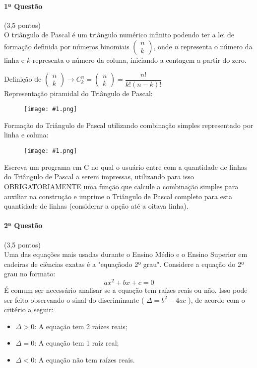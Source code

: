 \documentclass[12pt,a4paper]{article}
\newcommand{\imgh}[2]{\begin{figure}[h]
\centering
\texttt{[image: \#1.png]}
\end{figure}}
\begin{document}
\paragraph{1ª Questão} (3,5 pontos)\\
O triângulo de Pascal é um triângulo numérico infinito podendo ter a lei de formação definida por números binomiais $\left( \begin{matrix}n \\ k \end{matrix}\right)$, onde $n$ representa o número da linha e $k$ representa o número da coluna, iniciando a contagem a partir do zero.

Definição de $\left( \begin{matrix}n \\ k \end{matrix}\right) \longrightarrow C_k^n =\left( \begin{matrix}n \\ k \end{matrix}\right) = \dfrac{n!}{k!(n-k)!}$
\\
Representação piramidal do Triângulo de Pascal:

\imgh{pascal}{8}


\noindent Formação do Triângulo de Pascal utilizando combinação simples representado por linha e coluna:

\imgh{icvf2016q1}{8}

Escreva um programa em C no qual o usuário entre com a quantidade de linhas do Triângulo de Pascal a serem impressas, utilizando para isso OBRIGATORIAMENTE uma função que calcule a combinação simples para auxiliar na construção e imprime o Triângulo de Pascal completo para esta quantidade de linhas (considerar a opção até a oitava linha).

\paragraph{2ª Questão} (3,5 pontos)\\
Uma das equações mais usadas durante o Ensino Médio e o Ensino Superior em cadeiras de ciências exatas é a "equaçãodo 2º grau". Considere a equação do 2º grau no formato: 
$$ax^2 +bx + c = 0$$ É comum ser necessário analisar se a equação tem raízes reais ou não. Isso pode ser feito observando o sinal do discriminante ( $\Delta = b^2 - 4ac$ ), de acordo com o critério a seguir:
\begin{itemize}
\item $\Delta > 0$: A equação tem 2 raízes reais;
\item $\Delta = 0$: A equação tem 1 raiz real;
\item $\Delta < 0$: A equação não tem raízes reais.
\end{itemize}
\end{document}
